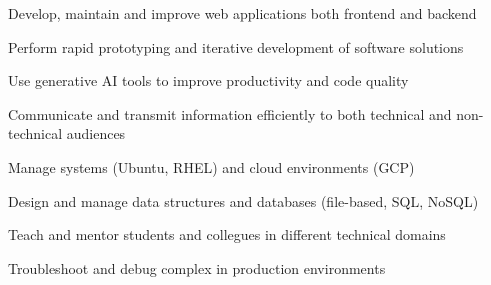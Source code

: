 

\begin{cvskills}

  \begin{minipage}[t]{0.45\textwidth}
    \cvskill
      {Develop, maintain and improve web applications both frontend and backend}
  \end{minipage}\hfill
  \begin{minipage}[t]{0.45\textwidth}
    \cvskill
      {Perform rapid prototyping and iterative development of software solutions}
  \end{minipage}

  \begin{minipage}[t]{0.45\textwidth}
   \cvskill
      {Use generative AI tools to improve productivity and code quality}
  \end{minipage}\hfill
  \begin{minipage}[t]{0.45\textwidth}
    \cvskill
      {Communicate and transmit information efficiently to both technical and non-technical audiences}
  \end{minipage}

  \begin{minipage}[t]{0.45\textwidth}
    \cvskill
      {Manage systems (Ubuntu, RHEL) and cloud environments (GCP)}
  \end{minipage}\hfill
  \begin{minipage}[t]{0.45\textwidth}
    \cvskill
      {Design and manage data structures and databases (file-based, SQL, NoSQL)}
  \end{minipage}

  \begin{minipage}[t]{0.45\textwidth}
    \cvskill
      {Teach and mentor students and collegues in different technical domains}
  \end{minipage}\hfill
  \begin{minipage}[t]{0.45\textwidth}
    \cvskill
      {Troubleshoot and debug complex in production environments}
  \end{minipage}

\end{cvskills}
